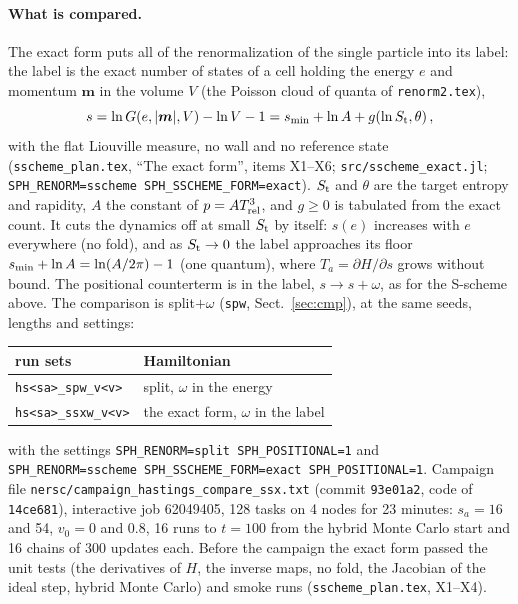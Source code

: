 \documentclass[11pt,aps,preprint,nofootinbib,superscriptaddress,tightenlines]{revtex4-2}
\def\st{\begin{equation}}
\def\stp{\end{equation}}
\def\Sect#1{Sect.~\ref{#1}}
\let\oldparagraph\paragraph
\renewcommand{\paragraph}{\par\bigskip\oldparagraph}
\begin{document}
\paragraph{What is compared.}  The exact form puts all of the renormalization of the single particle into its label: the label is the exact number of
states of a cell holding the energy $e$ and momentum $\bm m$ in the volume $V$ (the Poisson cloud of quanta of \texttt{renorm2.tex}),
\st
s=\ln G(e,|\bm m|,V)-\ln V-1=s_{\rm min}+\ln A+g(\ln S_{\rm t},\theta)\,,
\stp
with the flat Liouville measure, no wall and no reference state (\texttt{sscheme\_plan.tex}, ``The exact form'', items X1--X6;
\nolinkurl{src/sscheme_exact.jl}; \texttt{SPH\_RENORM=sscheme SPH\_SSCHEME\_FORM=exact}).  $S_{\rm t}$ and $\theta$ are the target entropy and rapidity, $A$ the
constant of $p=AT_{\rm rel}^3$, and $g\ge0$ is tabulated from the exact count.  It cuts the dynamics off at small $S_{\rm t}$ by itself: $s(e)$ increases with
$e$ everywhere (no fold), and as $S_{\rm t}\to0$ the label approaches its floor $s_{\rm min}+\ln A=\ln(A/2\pi)-1$ (one quantum), where $T_a=\partial H/\partial s$
grows without bound.  The positional counterterm is in the label, $s\to s+\omega$, as for the S-scheme above.  The comparison is split$+\omega$
(\texttt{spw}, \Sect{sec:cmp}), at the same seeds, lengths and settings:
\begin{center}
\begin{tabular}{ll}
\toprule
run sets & Hamiltonian \\
\midrule
\texttt{hs<sa>\_spw\_v<v>}  & split, $\omega$ in the energy \\
\texttt{hs<sa>\_ssxw\_v<v>} & the exact form, $\omega$ in the label \\
\bottomrule
\end{tabular}
\end{center}
with the settings \texttt{SPH\_RENORM=split SPH\_POSITIONAL=1} and \texttt{SPH\_RENORM=sscheme SPH\_SSCHEME\_FORM=exact SPH\_POSITIONAL=1}.
Campaign file \texttt{nersc/campaign\_hastings\_compare\_ssx.txt} (commit \texttt{93e01a2}, code of \texttt{14ce681}), interactive job 62049405, 128 tasks
on 4 nodes for 23 minutes: $s_a=16$ and 54, $v_0=0$ and 0.8, 16 runs to $t=100$ from the hybrid Monte Carlo start and 16 chains of 300 updates each.
Before the campaign the exact form passed the unit tests (the derivatives of $H$, the inverse maps, no fold, the Jacobian of the ideal step, hybrid
Monte Carlo) and smoke runs (\texttt{sscheme\_plan.tex}, X1--X4).
\end{document}
